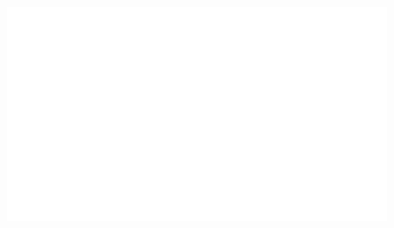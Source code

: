 \begin{centering}
    \begin{figure}
        \centering
        \includegraphics[width=\textwidth]{whyareyoucheckingthenameofthisfile.png}
    \end{figure}
\end{centering}
\noindent